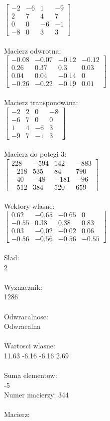 \documentclass[a4paper,12pt]{article}
\begin{document}
$\begin{bmatrix} -2&-6&1&-9\\2&7&4&7\\0&0&-6&-1\\-8&0&3&3 \end{bmatrix}$
\\
\\
Macierz odwrotna:\\

$\begin{bmatrix} -0.08&-0.07&-0.12&-0.12\\0.26&0.37&0.3&0.03\\0.04&0.04&-0.14&0\\-0.26&-0.22&-0.19&0.01 \end{bmatrix}$
\\
\\
Macierz transponowana:\\

$\begin{bmatrix} -2&2&0&-8\\-6&7&0&0\\1&4&-6&3\\-9&7&-1&3 \end{bmatrix}$
\\
\\
Macierz do potegi 3:\\

$\begin{bmatrix} 228&-594&142&-883\\-218&535&84&790\\-40&-48&-181&-96\\-512&384&520&659 \end{bmatrix}$
\\
\\
Wektory wlasne:\\

$\begin{bmatrix} 0.62&-0.65&-0.65&0\\-0.55&0.38&0.38&0.83\\0.03&-0.02&-0.02&0.06\\-0.56&-0.56&-0.56&-0.55 \end{bmatrix}$
\\
\\
Slad:\\
2
\\
\\
Wyznacznik:\\
1286
\\
\\
Odwracalnosc:\\
Odwracalna
\\
\\
Wartosci wlasne:\\
11.63 -6.16 -6.16 2.69
\\
\\
Suma elementow:\\
-5
\\
\newpage
Numer macierzy:
344
\\
\\
Macierz:\\
\end{document}
